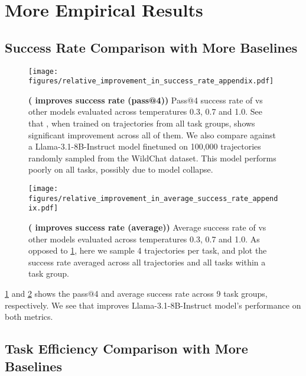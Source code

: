 \newpage

\section{More Empirical Results} \label{section:additional_experimental_results}


\subsection{Success Rate Comparison with More Baselines}

\begin{figure}[h]
    \centering
    \texttt{[image: figures/relative\_improvement\_in\_success\_rate\_appendix.pdf]}
    \caption{\textbf{(\ours{} improves success rate (pass@4))} Pass@4 success rate of \ours{} vs other models evaluated across temperatures 0.3, 0.7 and 1.0. See that \ours{}, when trained on trajectories from all task groups, shows significant improvement across all of them. We also compare against a Llama-3.1-8B-Instruct model finetuned on 100,000 trajectories randomly sampled from the WildChat dataset. This model performs poorly on all tasks, possibly due to model collapse.}
    \label{fig:all_environment_temperature_ablation_success_rate}
\end{figure}

\begin{figure}[h]
    \centering
    \texttt{[image: figures/relative\_improvement\_in\_average\_success\_rate\_appendix.pdf]}
    \caption{\textbf{(\ours{} improves success rate (average))} Average success rate of \ours{} vs other models evaluated across temperatures 0.3, 0.7 and 1.0. As opposed to \cref{fig:all_environment_temperature_ablation_success_rate}, here we sample 4 trajectories per task, and plot the success rate averaged across all trajectories and all tasks within a task group.}
    \label{fig:all_environment_temperature_ablation_average_success_rate}
\end{figure}

\cref{fig:all_environment_temperature_ablation_success_rate} and \cref{fig:all_environment_temperature_ablation_average_success_rate} shows the pass@4 and average success rate across 9 task groups, respectively. We see that \ours{} improves Llama-3.1-8B-Instruct model's performance on both metrics. 

\subsection{Task Efficiency Comparison with More Baselines}

